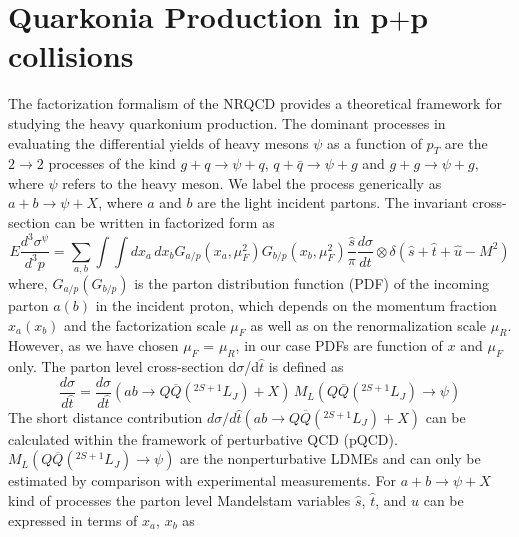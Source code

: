 \documentclass[aps,prc,preprint,superscriptaddress,showpacs,showkeys,amsmath]{revtex4-1}
\begin{document}
\section{Quarkonia Production in p$+$p collisions}
\label{section:ppProduction}
The factorization formalism of the NRQCD  provides a theoretical framework for 
studying the heavy quarkonium production. The dominant processes in evaluating 
the differential yields of heavy mesons $\psi$ as a function of $p_T$ are the $2\rightarrow 2$
processes of the kind $g+q\rightarrow \psi+q$, $q+\bar{q}\rightarrow \psi+g$ and
$g+g\rightarrow \psi+g$, where $\psi$ refers to the heavy meson. We label the process
generically as $a+b\rightarrow \psi+X$, where $a$ and $b$ are the light incident
partons. The invariant cross-section can be written in factorized form as 
\begin{equation}
    E\frac{d^{3}\sigma^{\psi}}{d^{3}p} = \sum_{a,b}\int \int dx_a\,dx_b 
    G_{a/p}(x_a,\mu_{F}^{2}) G_{b/p}(x_b,\mu_{F}^{2})\frac{\hat s}{\pi}\frac{d\sigma}{d\hat t}
    \otimes \delta(\hat s + \hat t + \hat u -M^{2}) 
\label{eqn:cross}
\end{equation}
where, $G_{a/p}(G_{b/p})$ is the parton distribution function (PDF) of the incoming parton $a(b)$ in the 
incident proton, which depends on the momentum fraction $x_a(x_b)$ and the factorization 
scale $\mu_F$ as well as on the renormalization scale $\mu_R$. However, 
as we have chosen $\mu_F$ = $\mu_R$, in our case PDFs are function of $x$ and $\mu_F$ only. 
The parton level cross-section d$\sigma$/d$\hat{t}$ is defined as~\cite{}
\begin{equation}
\frac{d\sigma}{d\hat t} = \frac{d\sigma}{d\hat t}(ab\rightarrow Q\overline{Q}(^{2S+1}L_{J})+X)\,M_{L}(Q\overline{Q}(^{2S+1}L_{J})\rightarrow\psi)
\end{equation}
The short distance contribution $d\sigma/d\hat t (ab\rightarrow Q\overline{Q}(^{2S+1}L_{J})+X)$ can be calculated within 
the framework of perturbative QCD (pQCD). $M_{L}(Q\overline{Q}(^{2S+1}L_{J})\rightarrow\psi)$ are the nonperturbative 
LDMEs and can only be estimated by comparison with experimental measurements. 
For $a+b\rightarrow \psi+X$ kind of processes the parton level  Mandelstam variables ${\hat s}$, ${\hat t}$, and ${\hat u}$
can be expressed in terms of $x_a$, $x_b$ as 
\end{document}
